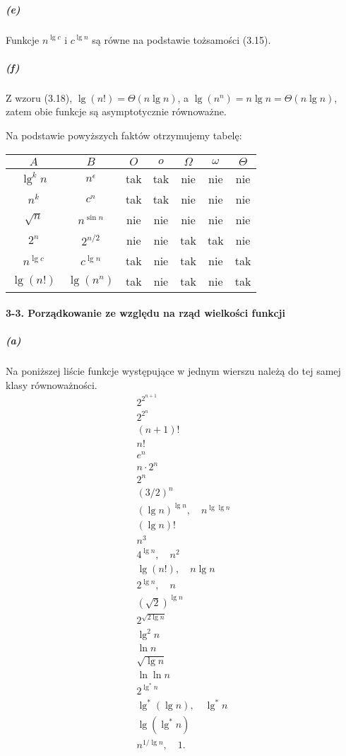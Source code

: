 \subparagraph{(e)}
Funkcje $n^{\lg c}$ i $c^{\lg n}$ są równe na podstawie tożsamości (3.15).

\subparagraph{(f)}
Z wzoru (3.18), $\lg(n!)=\Theta(n\lg n)$, a $\lg(n^n)=n\lg n=\Theta(n\lg n)$, zatem obie funkcje są asymptotycznie równoważne.

\bigskip
\noindent Na podstawie powyższych faktów otrzymujemy tabelę:
\begin{center}
\begin{tabular}{cc|c|c|c|c|c|}
  $A$ & $B$ & $O$ & $o$ & $\Omega$ & $\omega$ & $\Theta$ \\
  \hline
  $\lg^kn$ & $n^\epsilon$ & tak & tak & nie & nie & nie \\
  \hline
  $n^k$ & $c^n$ & tak & tak & nie & nie & nie \\
  \hline
  $\sqrt{n}$ & $n^{\sin n}$ & nie & nie & nie & nie & nie \\
  \hline
  $2^n$ & $2^{n/2}$ & nie & nie & tak & tak & nie \\
  \hline
  $n^{\lg c}$ & $c^{\lg n}$ & tak & nie & tak & nie & tak \\
  \hline
  $\lg(n!)$ & $\lg(n^n)$ & tak & nie & tak & nie & tak \\
  \hline
\end{tabular}
\end{center}

\paragraph{3-3. Porządkowanie ze względu na rząd wielkości funkcji}

\subparagraph{(a)}
Na poniższej liście funkcje występujące w jednym wierszu należą do tej samej klasy równoważności.
\[
  \begin{array}{ll}
	2^{2^{n+1}} \\
	2^{2^n} \\
	(n+1)! \\
	n! \\
	e^n \\
	n\cdot 2^n \\
	2^n \\
	(3/2)^n \\
	(\lg n)^{\lg n},\quad n^{\lg\lg n} \\
	(\lg n)! \\
	n^3 \\
	4^{\lg n},\quad n^2 \\
	\lg (n!),\quad n\lg n \\
	2^{\lg n},\quad n \\
	\left(\sqrt{2}\right)^{\lg n} \\
	2^{\sqrt{2\lg n}} \\
	\lg^2n \\
	\ln n \\
	\sqrt{\lg n} \\
	\ln\ln n \\
	2^{\lg^*n} \\
	\lg^*(\lg n),\quad \lg^*n \\
	\lg(\lg^*n) \\
	n^{1/\lg n},\quad 1.
  \end{array}
\]

